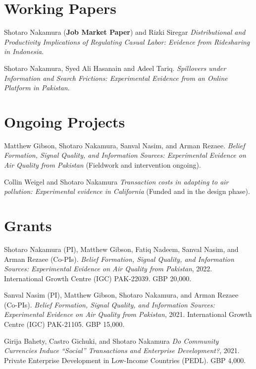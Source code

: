 \documentclass[10pt]{res} %
\begin{document}
\begin{resume}
\section{Working Papers}
\hangindent=0.7cm Shotaro Nakamura (\textbf{Job Market Paper}) and Rizki Siregar \textit{Distributional and Productivity Implications of Regulating Casual Labor: Evidence from Ridesharing in Indonesia}. 

\hangindent=0.7cm Shotaro Nakamura, Syed Ali Hasanain and Adeel Tariq. \textit{Spillovers under Information and Search Frictions: Experimental Evidence from an Online Platform in Pakistan}. 

\section{Ongoing Projects}
\hangindent=0.7cm Matthew Gibson, Shotaro Nakamura, Sanval Nasim, and Arman Rezaee. \textit{Belief Formation, Signal Quality, and Information Sources: Experimental Evidence on Air Quality from Pakistan} (Fieldwork and intervention ongoing). 

\hangindent=0.7cm Collin Weigel and Shotaro Nakamura \textit{Transaction costs in adapting to air pollution: Experimental evidence in California}  (Funded and in the design phase). 
\section{Grants} 
\hangindent=0.7cm  Shotaro Nakamura (PI), Matthew Gibson, Fatiq Nadeem, Sanval Nasim, and Arman Rezaee (Co-PIs). \textit{Belief Formation, Signal Quality, and Information Sources: Experimental Evidence on Air Quality from Pakistan}, 2022. International Growth Centre (IGC) PAK-22039. GBP 20,000. 

\hangindent=0.7cm  Sanval Nasim (PI), Matthew Gibson, Shotaro Nakamura, and Arman Rezaee (Co-PIs). \textit{Belief Formation, Signal Quality, and Information Sources: Experimental Evidence on Air Quality from Pakistan}, 2021. International Growth Centre (IGC) PAK-21105. GBP 15,000. 

\hangindent=0.7cm Girija Bahety, Castro Gichuki, and Shotaro Nakamura \textit{Do Community Currencies Induce ``Social'' Transactions and Enterprise Development?}, 2021. Private Enterprise Development in Low-Income Countries (PEDL). GBP 4,000. 


\end{resume}
\end{document}

